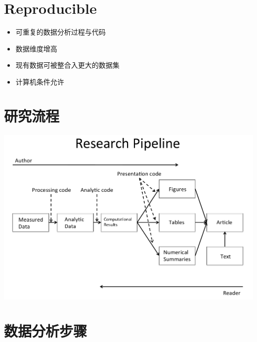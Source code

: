 \documentclass[]{book}
\providecommand{\tightlist}{%
  \setlength{\itemsep}{0pt}\setlength{\parskip}{0pt}}
\begin{document}
\hypertarget{reproducible}{%
\section{Reproducible}\label{reproducible}}

\begin{itemize}
\tightlist
\item
  可重复的数据分析过程与代码
\item
  数据维度增高
\item
  现有数据可被整合入更大的数据集
\item
  计算机条件允许
\end{itemize}

\section{研究流程}

\includegraphics[width=14.1in]{images/researchpipeline}

\section{数据分析步骤}
\end{document}
